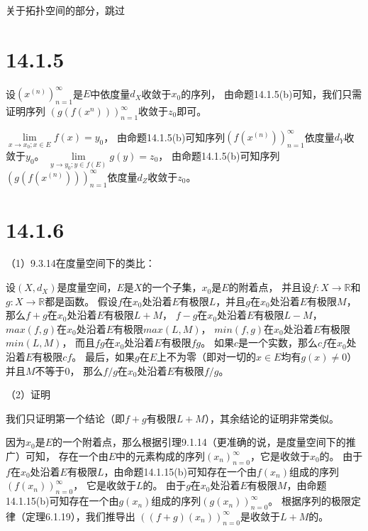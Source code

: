 \documentclass{article}
\begin{document}
关于拓扑空间的部分，跳过

\section*{14.1.5}

设$(x^{(n)})_{n = 1}^\infty$是$E$中依度量$d_X$收敛于$x_0$的序列，
由命题14.1.5(b)可知，我们只需证明序列
$(g(f(x^{n})))_{n = 1}^\infty$收敛于$z_0$即可。

$\lim\limits_{x \to x_0; x \in E} f(x) = y_0$，
由命题14.1.5(b)可知序列$(f(x^{(n)}))_{n = 1}^\infty$依度量$d_Y$收敛于$y_0$。
$\lim\limits_{y \to y_0; y \in f(E)} g(y) = z_0$，
由命题14.1.5(b)可知序列$(g(f(x^{(n)})))_{n = 1}^\infty$依度量$d_Z$收敛于$z_0$。

\section*{14.1.6}

（1）9.3.14在度量空间下的类比：

设$(X, d_X)$是度量空间，$E$是$X$的一个子集，$x_0$是$E$的附着点，
并且设$f: X \to \mathbb{R}$和$g: X \to \mathbb{R}$都是函数。
假设$f$在$x_0$处沿着$E$有极限$L$，并且$g$在$x_0$处沿着$E$有极限$M$，
那么$f + g$在$x_0$处沿着$E$有极限$L + M$，
$f - g$在$x_0$处沿着$E$有极限$L - M$，
$max(f,g)$在$x_0$处沿着$E$有极限$max(L, M)$，
$min(f,g)$在$x_0$处沿着$E$有极限$min(L, M)$，
而且$fg$在$x_0$处沿着$E$有极限$fg$。
如果$c$是一个实数，那么$cf$在$x_0$处沿着$E$有极限$cf$。
最后，如果$g$在$E$上不为零（即对一切的$x \in E$均有$g(x) \neq 0$）并且$M$不等于0，
那么$f/g$在$x_0$处沿着$E$有极限$f/g$。

（2）证明

我们只证明第一个结论（即$f + g$有极限$L + M$），其余结论的证明非常类似。

因为$x_0$是$E$的一个附着点，那么根据引理9.1.14（更准确的说，是度量空间下的推广）可知，
存在一个由$E$中的元素构成的序列$(x_n)_{n = 0}^\infty$，它是收敛于$x_0$的。
由于$f$在$x_0$处沿着$E$有极限$L$，由命题14.1.15(b)可知存在一个由$f(x_n)$组成的序列$(f(x_n))_{n = 0}^\infty$，
它是收敛于$L$的。
由于$g$在$x_0$处沿着$E$有极限$M$，由命题14.1.15(b)可知存在一个由$g(x_n)$组成的序列$(g(x_n))_{n = 0}^\infty$。
根据序列的极限定律（定理6.1.19），我们推导出
$((f+g)(x_n))_{n = 0}^\infty$是收敛于$L + M$的。
\end{document}
